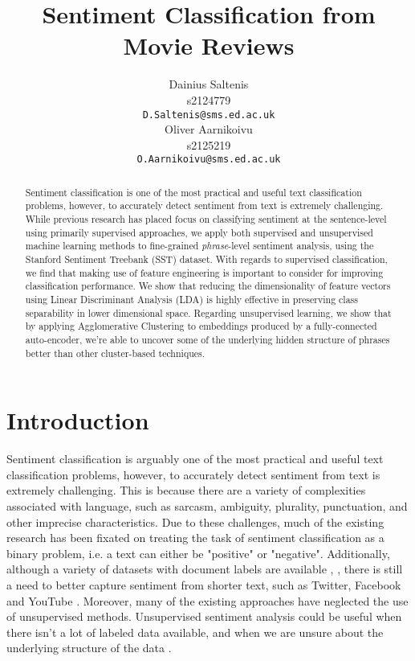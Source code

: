\documentclass{article}
\title{Sentiment Classification from Movie Reviews}
\author{
  Dainius Saltenis\\
  s2124779\\
  \texttt{D.Saltenis@sms.ed.ac.uk} \\
  \And
  Oliver Aarnikoivu\\
  s2125219\\
  \texttt{O.Aarnikoivu@sms.ed.ac.uk} \\
}
\begin{document}
\maketitle

\begin{abstract}
Sentiment classification is one of the most practical and useful text classification problems, however, to accurately detect sentiment from text is extremely challenging. While previous research has placed focus on classifying sentiment at the sentence-level using primarily supervised approaches, we apply both supervised and unsupervised machine learning methods to fine-grained \emph{phrase}-level sentiment analysis, using the Stanford Sentiment Treebank (SST) dataset. With regards to supervised classification, we find that making use of feature engineering is important to consider for improving classification performance. We show that reducing the dimensionality of feature vectors using Linear Discriminant Analysis (LDA) is highly effective in preserving class separability in lower dimensional space. Regarding unsupervised learning, we show that by applying Agglomerative Clustering to embeddings produced by a fully-connected auto-encoder, we're able to uncover some of the underlying hidden structure of phrases better than other cluster-based techniques.  
\end{abstract}

\section{Introduction}

Sentiment classification is arguably one of the most practical and useful text classification problems, however, to accurately detect sentiment from text is extremely challenging. This is because there are a variety of complexities associated with language, such as sarcasm, ambiguity, plurality, punctuation, and other imprecise characteristics. Due to these challenges, much of the existing research has been fixated on treating the task of sentiment classification as a binary problem, i.e. a text can either be "positive" or "negative". Additionally, although a variety of datasets with document labels are available \cite{maas-etal-2011-learning}, \cite{article}, there is still a need to better capture sentiment from shorter text, such as Twitter, Facebook and YouTube \cite{socher-etal-2013-recursive}. Moreover, many of the existing approaches have neglected the use of unsupervised methods. Unsupervised sentiment analysis could be useful when there isn't a lot of labeled data available, and when we are unsure about the underlying structure of the data \cite{Hastie2009}. 
\end{document}
